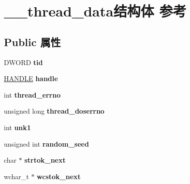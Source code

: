 \hypertarget{struct____thread__data}{}\section{\+\_\+\+\_\+thread\+\_\+data结构体 参考}
\label{struct____thread__data}
\subsection*{Public 属性}
\begin{DoxyCompactItemize}
\item 
\mbox{\label{struct____thread__data_aa15d7251defa5fe5c5d82ac8b52b5a77}} 
D\+W\+O\+RD {\bfseries tid}
\item 
\mbox{\label{struct____thread__data_a8f12e712d2cce4a37f095024d76cf3e0}} 
\hyperlink{interfacevoid}{H\+A\+N\+D\+LE} {\bfseries handle}
\item 
\mbox{\label{struct____thread__data_a5e0fe46440e9780e674fd590a194ddd4}} 
int {\bfseries thread\+\_\+errno}
\item 
\mbox{\label{struct____thread__data_a87ae0e2bfd495ba4171201a79a7659d5}} 
unsigned long {\bfseries thread\+\_\+doserrno}
\item 
\mbox{\label{struct____thread__data_a95e6ac3945037de0ba2ac56076b896b0}} 
int {\bfseries unk1}
\item 
\mbox{\label{struct____thread__data_a98baf93dd2789bd1a979bf8c8ef0d677}} 
unsigned int {\bfseries random\+\_\+seed}
\item 
\mbox{\label{struct____thread__data_a6cdeaa9db8beeec6e7a4b3e3a1a4c260}} 
char $\ast$ {\bfseries strtok\+\_\+next}
\item 
\mbox{\label{struct____thread__data_a234e332bff169ed0818d528dafda3e56}} 
wchar\+\_\+t $\ast$ {\bfseries wcstok\+\_\+next}
\item 
\mbox{\label{struct____thread__data_aeb559d56fd9b664175a22a2055b50a41}} 

\end{DoxyCompactItemize}
